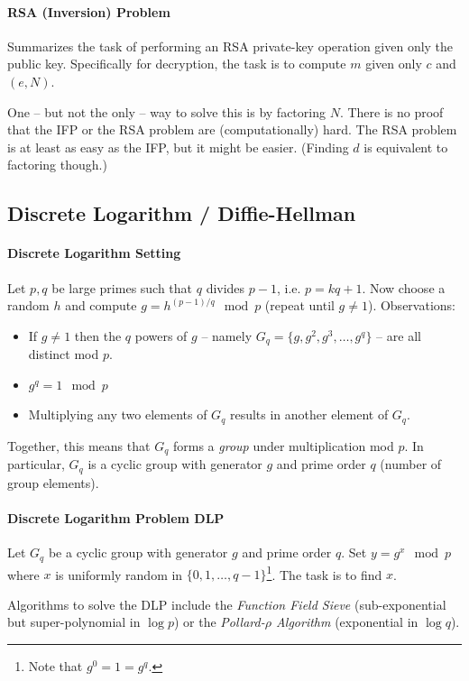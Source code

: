 \paragraph{RSA (Inversion) Problem}
Summarizes the task of performing an RSA private-key operation given only the public key.
Specifically for decryption, the task is to compute $m$ given only $c$ and $(e, N)$.

One -- but not the only -- way to solve this is by factoring $N$.
There is no proof that the IFP or the RSA problem are (computationally) hard.
The RSA problem is at least as easy as the IFP, but it might be easier.
(Finding $d$ is equivalent to factoring though.)


\subsection{Discrete Logarithm / Diffie-Hellman}

\paragraph{Discrete Logarithm Setting}
Let $p, q$ be large primes such that $q$ divides $p-1$, i.e. $p = kq + 1$.
Now choose a random $h$ and compute $g = h^{(p-1)/q} \mod p$ (repeat until $g \neq 1$).
Observations:
\begin{itemize}
\item
If $g \neq 1$ then the $q$ powers of $g$ -- namely $G_q = \{ g, g^2, g^3, \dots, g^q \}$
-- are all distinct mod $p$.
\item
$g^q = 1 \mod p$
\item
Multiplying any two elements of $G_q$ results in another element of $G_q$.
\end{itemize}
Together, this means that $G_q$ forms a \emph{group} under multiplication mod $p$.
In particular, $G_q$ is a cyclic group with generator $g$ and prime order $q$ (number of group elements).

\paragraph{Discrete Logarithm Problem DLP}
Let $G_q$ be a cyclic group with generator $g$ and prime order $q$.
Set $y = g^x \mod p$ where $x$ is uniformly random in $\{ 0, 1, \dots , q-1 \}$\footnote{Note that $g^0 = 1 = g^q$.}.
The task is to find $x$.

Algorithms to solve the DLP include the \emph{Function Field Sieve}
(sub-exponential but super-polynomial in $\log p$) or
the \emph{Pollard-$\rho$ Algorithm} (exponential in $\log q$).


